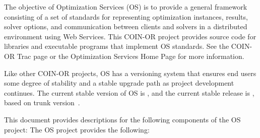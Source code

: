 
The objective of Optimization Services (OS) is to provide a general framework consisting of a set of standards
for representing optimization instances, results, solver options, and communication between clients and solvers
in a distributed environment using Web Services. This COIN-OR project provides source code for libraries and
executable programs that implement OS standards.  See the COIN-OR Trac page {\tt\UrlTrac}
or the Optimization Services Home Page {\tt\UrlOs} for more information.

Like other COIN-OR projects, OS has a versioning system that ensures end users some degree of stability 
and a stable upgrade path as project development continues. The current stable version of OS is \OSstable, 
and the current stable release is \OSrelease{}, based on trunk version~\OStrunk.

\ifruncode
This document provides descriptions for the following components of the OS project:
\else
The OS project provides the following:
\fi

